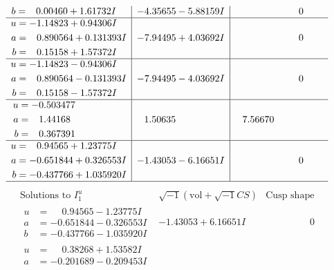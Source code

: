 \documentclass[1p]{elsarticle_modified}
\theoremstyle{definition}
\newcommand{\I}{\sqrt{-1}}
\begin{document}
$$\begin{array}{c|c|c}
\begin{aligned}
b &= \phantom{-}0.00460 + 1.61732 I\end{aligned}
 & -4.35655 - 5.88159 I & \phantom{-0.000000 } 0 \\ \hline\begin{aligned}
u &= -1.14823 + 0.94306 I \\
a &= \phantom{-}0.890564 + 0.131393 I \\
b &= \phantom{-}0.15158 + 1.57372 I\end{aligned}
 & -7.94495 + 4.03692 I & \phantom{-0.000000 } 0 \\ \hline\begin{aligned}
u &= -1.14823 - 0.94306 I \\
a &= \phantom{-}0.890564 - 0.131393 I \\
b &= \phantom{-}0.15158 - 1.57372 I\end{aligned}
 & -7.94495 - 4.03692 I & \phantom{-0.000000 } 0 \\ \hline\begin{aligned}
u &= -0.503477\phantom{ +0.000000I} \\
a &= \phantom{-}1.44168\phantom{ +0.000000I} \\
b &= \phantom{-}0.367391\phantom{ +0.000000I}\end{aligned}
 & \phantom{-}1.50635\phantom{ +0.000000I} & \phantom{-}7.56670\phantom{ +0.000000I} \\ \hline\begin{aligned}
u &= \phantom{-}0.94565 + 1.23775 I \\
a &= -0.651844 + 0.326553 I \\
b &= -0.437766 + 1.035920 I\end{aligned}
 & -1.43053 - 6.16651 I & \phantom{-0.000000 } 0\\
 \hline 
 \end{array}$$\newpage$$\begin{array}{c|c|c}  
\text{Solutions to }I^u_{1}& \I (\text{vol} + \sqrt{-1}CS) & \text{Cusp shape}\\
 \hline 
\begin{aligned}
u &= \phantom{-}0.94565 - 1.23775 I \\
a &= -0.651844 - 0.326553 I \\
b &= -0.437766 - 1.035920 I\end{aligned}
 & -1.43053 + 6.16651 I & \phantom{-0.000000 } 0 \\ \hline\begin{aligned}
u &= \phantom{-}0.38268 + 1.53582 I \\
a &= -0.201689 - 0.209453 I \\

\end{aligned}
\end{array}$$
\end{document}
